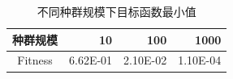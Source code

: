 \begin{table}[htbp]
	\centering
	\caption{不同种群规模下目标函数最小值}
	\begin{tabular}{crrr}
		\toprule[1.5pt]
		\label{tab2}
		\textbf{种群规模}  & \textbf{10}    & \textbf{100}   & \textbf{1000} \\
		\midrule[1pt]
		Fitness & 6.62E-01 & 2.10E-02 & 1.10E-04 \\
		\bottomrule[1.5pt]
	\end{tabular}%


\end{table}
